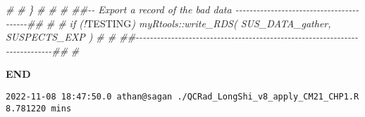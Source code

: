 \documentclass[
  10pt,
  a4paper,oneside]{article}
\newenvironment{Shaded}{\begin{snugshade}}{\end{snugshade}}
\newcommand{\AlertTok}[1]{\textcolor[rgb]{0.94,0.16,0.16}{#1}}
\newcommand{\CommentTok}[1]{\textcolor[rgb]{0.56,0.35,0.01}{\textit{#1}}}
\begin{document}
\begin{Shaded}
\begin{Highlighting}[]
\CommentTok{\#}
\CommentTok{\# \}}
\CommentTok{\#}
\CommentTok{\# \# \#\#{-}{-} Export a record of the bad data {-}{-}{-}{-}{-}{-}{-}{-}{-}{-}{-}{-}{-}{-}{-}{-}{-}{-}{-}{-}{-}{-}{-}{-}{-}{-}{-}{-}{-}{-}{-}{-}{-}{-}{-}{-}{-}{-}{-}{-}{-}\#\#}
\CommentTok{\# \# if (!}\AlertTok{TESTING}\CommentTok{) myRtools::write\_RDS( SUS\_DATA\_gather, SUSPECTS\_EXP )}
\CommentTok{\# \# \#\#{-}{-}{-}{-}{-}{-}{-}{-}{-}{-}{-}{-}{-}{-}{-}{-}{-}{-}{-}{-}{-}{-}{-}{-}{-}{-}{-}{-}{-}{-}{-}{-}{-}{-}{-}{-}{-}{-}{-}{-}{-}{-}{-}{-}{-}{-}{-}{-}{-}{-}{-}{-}{-}{-}{-}{-}{-}{-}{-}{-}{-}{-}{-}{-}{-}{-}{-}{-}{-}{-}{-}{-}{-}{-}{-}{-}\#\#}
\CommentTok{\#}
\end{Highlighting}
\end{Shaded}

\textbf{END}

\begin{verbatim}
2022-11-08 18:47:50.0 athan@sagan ./QCRad_LongShi_v8_apply_CM21_CHP1.R 8.781220 mins
\end{verbatim}
\end{document}

